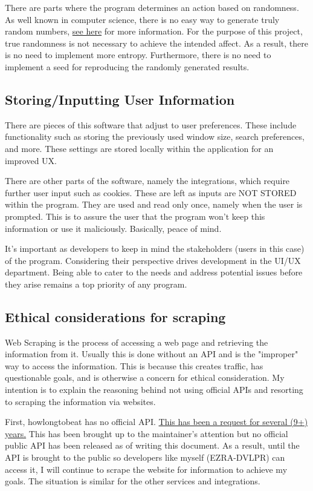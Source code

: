 There are parts where the program determines an action based on
randomness. As well known in computer science, there is no easy way
to generate truly random numbers,
\href{https://www.freecodecamp.org/news/true-randomness-in-software-engineering/}{see
here} for more information. For the purpose of this project,
true randomness is not necessary to achieve the intended affect. As a
result, there is no need to implement more entropy. Furthermore,
there is no need to implement a seed for reproducing the randomly
generated results.

\subsection{Storing/Inputting User Information}

There are pieces of this software that adjust to user preferences.
These include functionality such as storing the previously used
window size, search preferences, and more. These settings are stored
locally within the application for an improved UX.

There are other parts of the software, namely the integrations, which
require further user input such as cookies. These are left as inputs
are NOT STORED within the program. They are used and read only once, namely
when the user is prompted. This is to assure the user that the
program won't keep this information or use it maliciously. Basically,
peace of mind.

It's important as developers to keep in mind the stakeholders (users
in this case) of the program. Considering their perspective drives
development in the UI/UX department. Being able to cater to the needs
and address potential issues before they arise remains a top priority
of any program.

\subsection{Ethical considerations for scraping}

Web Scraping is the process of accessing a web page and retrieving
the information from it. Usually this is done without an API and is
the "improper" way to access the information. This is because this
creates traffic, has questionable goals, and is otherwise a concern
for ethical consideration. My intention is to explain the reasoning
behind not using official APIs and resorting to scraping the
information via websites.

First, howlongtobeat has no official API.
\href{https://howlongtobeat.com/forum/thread/807/1}{This has been a
request for several (9+) years.} This has been brought up to the
maintainer's attention but no official public API has been released
as of writing this
document. As a result, until the API is brought to the public so
developers like myself (EZRA-DVLPR) can access it, I will continue to scrape
the website for information to achieve my goals.
The situation is similar for the other services and integrations.


